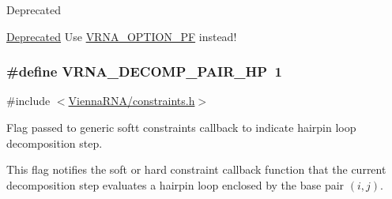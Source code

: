 \begin{DoxyRefDesc}{Deprecated}
\item[\hyperlink{deprecated__deprecated000041}{Deprecated}]Use \hyperlink{group__fold__compound_gabfbadcddda3e74ce7f49035ef8f058f7}{V\+R\+N\+A\+\_\+\+O\+P\+T\+I\+O\+N\+\_\+\+P\+F} instead!\end{DoxyRefDesc}
\hypertarget{group__constraints_ga8bd41ebc8039378d242e4e8c273716a5}{}
\subsubsection[{V\+R\+N\+A\+\_\+\+D\+E\+C\+O\+M\+P\+\_\+\+P\+A\+I\+R\+\_\+\+H\+P}]{\setlength{\rightskip}{0pt plus 5cm}\#define V\+R\+N\+A\+\_\+\+D\+E\+C\+O\+M\+P\+\_\+\+P\+A\+I\+R\+\_\+\+H\+P~1}\label{group__constraints_ga8bd41ebc8039378d242e4e8c273716a5}


{\ttfamily \#include $<$\hyperlink{constraints_8h}{Vienna\+R\+N\+A/constraints.\+h}$>$}



Flag passed to generic softt constraints callback to indicate hairpin loop decomposition step. 

This flag notifies the soft or hard constraint callback function that the current decomposition step evaluates a hairpin loop enclosed by the base pair $(i,j)$.

